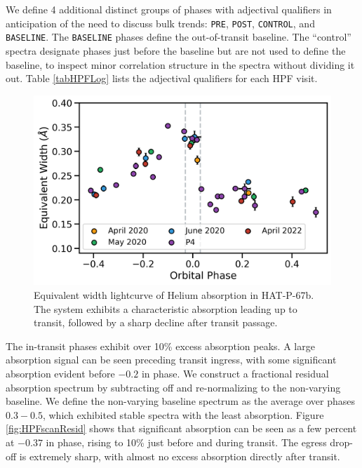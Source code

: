 \documentclass[twocolumn]{aastex631}
\begin{document}
We define 4 additional distinct groups of phases with adjectival qualifiers in anticipation of the need to discuss bulk trends: \texttt{PRE}, \texttt{POST}, \texttt{CONTROL}, and \texttt{BASELINE}.  The \texttt{BASELINE} phases define the out-of-transit baseline.  The ``control'' spectra designate phases just before the baseline but are not used to define the baseline, to inspect minor correlation structure in the spectra without dividing it out.  Table \ref{tabHPFLog} lists the adjectival qualifiers for each HPF visit.

\begin{figure}
    \includegraphics[width=\linewidth]{figures/HAT_P_67b_Helium10830EW_byCampaign.png}
    \caption{Equivalent width lightcurve of Helium absorption in HAT-P-67b.  The system exhibits a characteristic absorption leading up to transit, followed by a sharp decline after transit passage.}
    \label{fig:HPFtimeseries}
\end{figure}


The in-transit phases exhibit over 10\% excess absorption peaks.  A large absorption signal can be seen preceding transit ingress, with some significant absorption evident before $-0.2$ in phase.  We construct a fractional residual absorption spectrum by subtracting off and re-normalizing to the non-varying baseline.  We define the non-varying baseline spectrum as the average over phases $0.3-0.5$, which exhibited stable spectra with the least absorption.  Figure \ref{fig:HPFscanResid} shows that significant absorption can be seen as a few percent at $-0.37$ in phase, rising to 10\% just before and during transit.  The egress drop-off is extremely sharp, with almost no excess absorption directly after transit.

\end{document}
